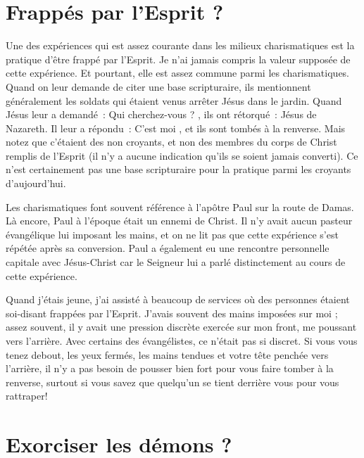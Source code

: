 \section*{Frappés par l'Esprit ?}

Une des expériences qui est assez courante dans les milieux charismatiques
 est la pratique d'être \og frappé par l'Esprit. \fg{}
 Je n'ai jamais compris la valeur supposée de cette expérience.
 Et pourtant, elle est assez commune parmi les charismatiques.
 Quand on leur demande de citer une base scripturaire,
 ils mentionnent généralement les soldats qui étaient venus arrêter
 Jésus dans le jardin. Quand Jésus leur a demandé~:
 \og Qui cherchez-vous ? \fg{}, ils ont rétorqué~:
 \og Jésus de Nazareth. \fg{} Il leur a répondu~:
 \og C'est moi \fg{}, et ils sont tombés à la renverse.
 Mais notez que c'étaient des non croyants, et non des membres
 du corps de Christ remplis de l'Esprit (il n'y a aucune indication
 qu'ils se soient jamais converti). Ce n'est certainement pas une base
 scripturaire pour la pratique parmi les croyants d'aujourd'hui.

\begin{specialpar}{}
Les charismatiques font souvent référence à l'apôtre Paul sur la route
 de Damas. Là encore, Paul à l'époque était un ennemi de Christ.
 Il n'y avait aucun pasteur évangélique lui imposant les mains,
 et on ne lit pas que cette expérience s'est répétée après sa conversion.
 Paul a également eu une rencontre personnelle capitale avec Jésus-Christ
 car le Seigneur lui a parlé distinctement au cours de cette expérience.
\end{specialpar}

Quand j'étais jeune, j'ai assisté à beaucoup de services où des personnes
 étaient soi-disant frappées par l'Esprit.
 J'avais souvent des mains imposées sur moi ; assez souvent,
 il y avait une pression discrète exercée sur mon front,
 me poussant vers l'arrière. Avec certains des évangélistes,
 ce n'était pas si discret. Si vous vous tenez debout, les yeux fermés,
 les mains tendues et votre tête penchée vers l'arrière,
 il n'y a pas besoin de pousser bien fort pour vous faire tomber
 à la renverse, surtout si vous savez que quelqu'un se tient derrière
 vous pour vous rattraper!


\section*{Exorciser les démons ?}

